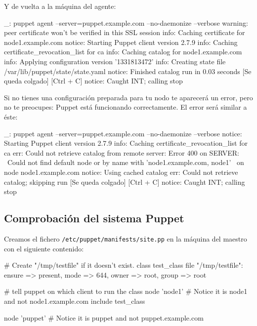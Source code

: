 Y de vuelta a la máquina del agente:

\begin{bashcode}
_: puppet agent --server=puppet.example.com --no-daemonize --verbose
warning: peer certificate won't be verified in this SSL session
info: Caching certificate for node1.example.com
notice: Starting Puppet client version 2.7.9
info: Caching certificate_revocation_list for ca
info: Caching catalog for node1.example.com
info: Applying configuration version '1331813472'
info: Creating state file /var/lib/puppet/state/state.yaml
notice: Finished catalog run in 0.03 seconds
[Se queda colgado]
[Ctrl + C]
notice: Caught INT; calling stop
\end{bashcode}

Si no tienes una configuración preparada para tu nodo te aparecerá un error, pero no te preocupes: Puppet está funcionando correctamente. El error será similar a éste:

\begin{bashcode}
_: puppet agent --server=puppet.example.com --no-daemonize --verbose
notice: Starting Puppet client version 2.7.9
info: Caching certificate_revocation_list for ca
err: Could not retrieve catalog from remote server: Error 400 on SERVER: \
Could not find default node or by name with 'node1.example.com, node1' \
on node node1.example.com
notice: Using cached catalog
err: Could not retrieve catalog; skipping run
[Se queda colgado]
[Ctrl + C]
notice: Caught INT; calling stop
\end{bashcode}


\subsection{Comprobación del sistema Puppet}

Creamos el fichero \texttt{/etc/puppet/manifests/site.pp} en la máquina del maestro con el siguiente contenido:

\begin{rubycode}
# Create "/tmp/testfile" if it doesn't exist.
class test_class {
    file { "/tmp/testfile":
       ensure => present,
       mode   => 644,
       owner  => root,
       group  => root
    }
}

# tell puppet on which client to run the class
node 'node1' {            # Notice it is node1 and not node1.example.com
    include test_class
}

node 'puppet' {           # Notice it is puppet and not puppet.example.com
}
\end{rubycode}

